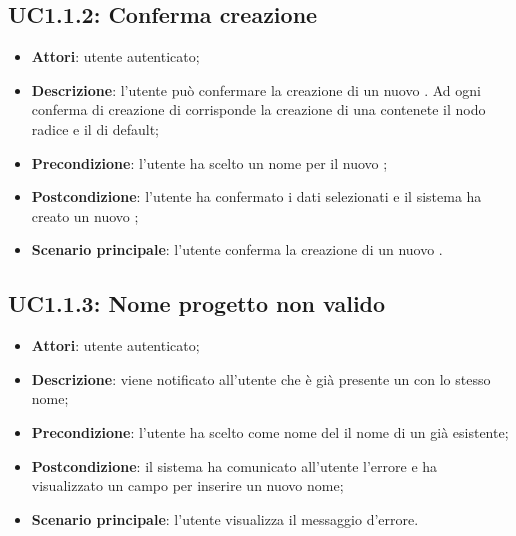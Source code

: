 \subsection{UC1.1.2: Conferma creazione}
\label{UC1.1.2}
\begin{itemize}
\item \textbf{Attori}: utente autenticato;
\item \textbf{Descrizione}: l'utente può confermare la creazione di un nuovo . Ad ogni conferma di creazione di  corrisponde la creazione di una  contenete il nodo radice e il  di default;
\item \textbf{Precondizione}: l'utente ha scelto un nome per il nuovo ;
\item \textbf{Postcondizione}: l'utente ha confermato i dati selezionati e il sistema ha creato un nuovo ;
\item \textbf{Scenario principale}:
l'utente conferma la creazione di un nuovo .
\end{itemize}
\subsection{UC1.1.3: Nome progetto non valido}
\label{UC1.1.3}
\begin{itemize}
\item \textbf{Attori}: utente autenticato;
\item \textbf{Descrizione}: viene notificato all’utente che è già presente un  con lo stesso nome;
\item \textbf{Precondizione}: l’utente ha scelto come nome del  il nome di un  già esistente;
\item \textbf{Postcondizione}: il sistema ha comunicato all’utente l’errore e ha visualizzato un campo per inserire un nuovo nome;
\item \textbf{Scenario principale}:
l’utente visualizza il messaggio d’errore.
\end{itemize}
